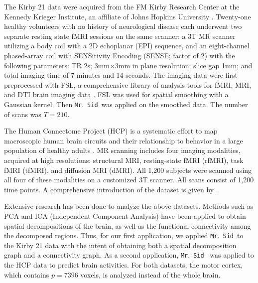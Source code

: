 \documentclass[fleqn,12pt]{article}
\newcommand{\mrsid}{{\sc \texttt{Mr}.~\texttt{Sid}}}
\begin{document}
The Kirby 21 data were acquired from the FM Kirby Research Center at the Kennedy Krieger Institute, an affiliate of Johns Hopkins University \citep{landman2011multi}. Twenty-one healthy volunteers with no history of neurological disease each underwent two separate resting state fMRI sessions on the same scanner: a 3T MR scanner utilizing a body coil with a 2D echoplanar (EPI) sequence, and an eight-channel phased-array coil with SENSitivity Encoding (SENSE; factor of 2) with the following parameters: TR 2s; 3mm$\times$3mm in plane resolution; slice gap 1mm; and total imaging time of 7 minutes and 14 seconds. The imaging data were first preprocessed with FSL, a comprehensive library of analysis tools for fMRI, MRI, and DTI brain imaging data \citep{smith2004advances}. FSL was used for spatial smoothing with a Gaussian kernel. Then \mrsid~was applied on the smoothed data.  The number of scans was $T = 210$.
%
%
%
%
%
%

The Human Connectome Project (HCP) is a systematic effort to map macroscopic human brain circuits and their relationship to behavior in a large population of healthy adults \citep{van2013wu,moeller2010multiband,feinberg2010multiplexed}. MR scanning includes four imaging modalities, acquired at high resolutions: structural MRI, resting-state fMRI (rfMRI), task fMRI (tfMRI), and diffusion MRI (dMRI). All 1,200 subjects were scanned using all four of these modalities on a customized 3T scanner.  All scans consist of 1,200 time points. A comprehensive introduction of the dataset is given by \cite{van2013wu}.


Extensive research has been done to analyze the above datasets. Methods such as PCA and ICA (Independent Component Analysis) have been applied to obtain spatial decompositions of the brain, as well as the functional connectivity among the decomposed regions.  Thus, for our first application, we applied \mrsid~to the Kirby 21 data with the intent of obtaining both a spatial decomposition graph and a connectivity graph. As a second application, \mrsid~ was applied to the HCP data to predict brain activities. For both datasets, the motor cortex, which contains $p=7396$ voxels, is analyzed instead of the whole brain.
\end{document}
